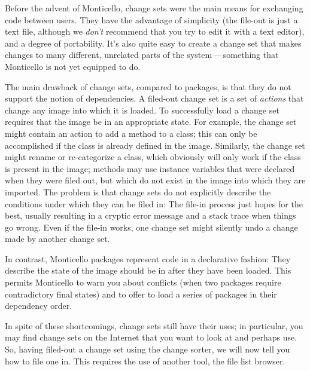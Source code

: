 \documentclass[a4paper,10pt,twoside]{book}
\begin{document}
Before the advent of Monticello, change sets were the main means for exchanging code between \sq{} users.
They have the advantage of simplicity (the file-out is just a text file, although we \emph{don't} recommend that you try to edit it with a text editor), and a degree of portability.
It's also quite easy to create a change set that makes changes to many different, unrelated parts of the system\,---\,something that Monticello is not yet equipped to do.

The main drawback of change sets, compared to  packages, is that they do not support the notion of dependencies.
A filed-out change set is a set of \emph{actions} that change any image into which it is loaded.
To successfully load a change set requires that the image be in an appropriate state.
For example, the change set might contain an action to add a method to a class; this can only be accomplished if the class is already defined in the image.
Similarly, the change set might rename or re-categorize a class, which obviously will only work if the class is present in the image; methods may use instance variables that were declared when they were filed out, but which do not exist in the image into which they are imported.
The problem is that change sets do not explicitly describe the conditions under which they can be filed in:
The file-in process just hopes for the best, usually resulting in a cryptic error message and a stack trace when things go wrong.
Even if the file-in works, one change set might silently undo a change made by another change set.

In contrast, Monticello packages represent code in a declarative fashion:
They describe the state of the image should be in after they have been loaded.
This permits Monticello to warn you about conflicts (when two packages require contradictory final states) and to offer to load a series of packages in their dependency order.

In spite of these shortcomings, change sets still have their uses; in particular, you may find change sets on the Internet that you want to look at and perhaps use.
So, having filed-out a change set using the change sorter, we will now tell you how to file one in.
This requires the use of another tool, the file list browser.


\end{document}
